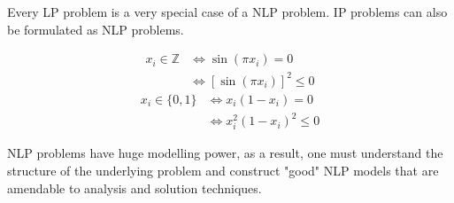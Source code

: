 Every LP problem is a very special case of a NLP problem. IP problems can
also be formulated as NLP problems.
\begin{exbox}
    \begin{example}
        \begin{align*}
            x_i\in\mathbb{Z} & \iff \sin(\pi x_i)=0              \\
                             & \iff [\sin(\pi x_i)]^2\leqslant 0
        \end{align*}
        \begin{align*}
            x_i\in \{0,1\} & \iff x_i(1-x_i)=0              \\
                           & \iff x_i^2(1-x_i)^2\leqslant 0
        \end{align*}

        NLP problems have huge modelling power, as a result, one must understand the
        structure of the underlying problem and construct "good" NLP models that are
        amendable to analysis and solution techniques.
    \end{example}
\end{exbox}
